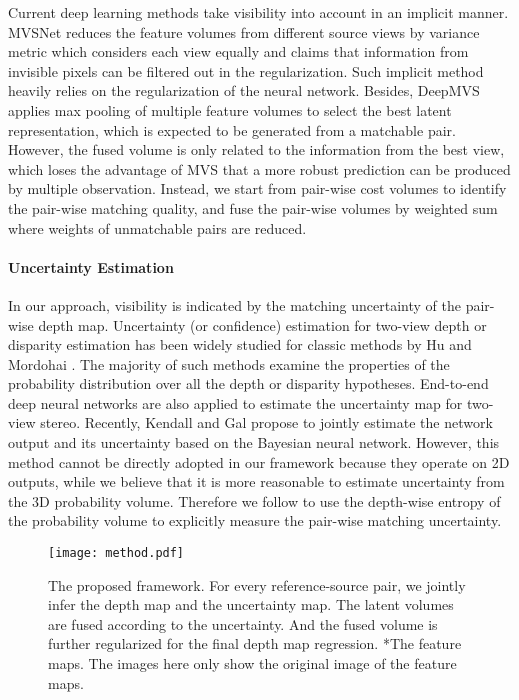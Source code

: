 \documentclass{bmvc2k}
\begin{document}
Current deep learning methods take visibility into account in an implicit manner. MVSNet \cite{yao2018mvsnet} reduces the feature volumes from different source views by variance metric which considers each view equally and claims that information from invisible pixels can be filtered out in the regularization. Such implicit method heavily relies on the regularization of the neural network. Besides, DeepMVS \cite{huang2018deepmvs} applies max pooling of multiple feature volumes to select the best latent representation, which is expected to be generated from a matchable pair. However, the fused volume is only related to the information from the best view, which loses the advantage of MVS that a more robust prediction can be produced by multiple observation. Instead, we start from pair-wise cost volumes to identify the pair-wise matching quality, and fuse the pair-wise volumes by weighted sum where weights of unmatchable pairs are reduced. 

\vspace{-5mm}\paragraph{Uncertainty Estimation}
In our approach, visibility is indicated by the matching uncertainty of the pair-wise depth map. Uncertainty (or confidence) estimation for two-view depth or disparity estimation has been widely studied for classic methods by Hu and Mordohai \cite{hu2012quantitative}. The majority of such methods examine the properties of the probability distribution over all the depth or disparity hypotheses. End-to-end deep neural networks \cite{poggi2016learning, kim2018unified, tosi2018beyond, kim2019laf} are also applied to estimate the uncertainty map for two-view stereo. Recently, Kendall and Gal \cite{kendall2017uncertainties} propose to jointly estimate the network output and its uncertainty based on the Bayesian neural network. However, this method cannot be directly adopted in our framework because they operate on 2D outputs, while we believe that it is more reasonable to estimate uncertainty from the 3D probability volume. Therefore we follow \cite{zhang2020learning} to use the depth-wise entropy of the probability volume to explicitly measure the pair-wise matching uncertainty. 



\begin{figure}[]
	\centering
	\texttt{[image: method.pdf]}
	\vspace{-8mm}
	\caption{The proposed framework. For every reference-source pair, we jointly infer the depth map and the uncertainty map. The latent volumes are fused according to the uncertainty. And the fused volume is further regularized for the final depth map regression. *The feature maps. The images here only show the original image of the feature maps. }
	\vspace{-3mm}
	\label{fig:framework}
\end{figure}
\end{document}
